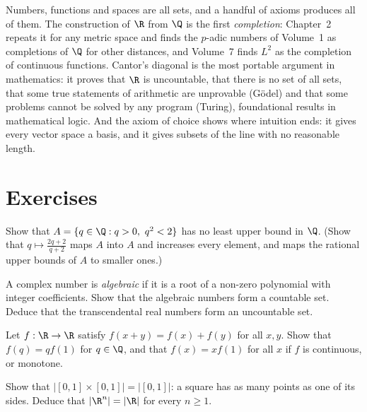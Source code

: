 \begin{beauty}
Numbers, functions and spaces are all sets, and a handful of axioms produces all of them. The construction of $\R$
from $\Q$ is the first \emph{completion}: Chapter~2 repeats it for any metric space and finds the $p$-adic numbers of
Volume~1 as completions of $\Q$ for other distances, and Volume~7 finds $L^2$ as the completion of continuous
functions. Cantor's diagonal is the most portable argument in mathematics: it proves that $\R$ is uncountable, that
there is no set of all sets, that some true statements of arithmetic are unprovable (G\"odel) and that some
problems cannot be solved by any program (Turing), foundational results in mathematical logic. And the axiom of choice shows where
intuition ends: it gives every vector space a basis, and it gives subsets of the line with no reasonable length.
\end{beauty}

\section{Exercises}

\begin{exercise}[$\star$]\label{ex:sqrt2}
Show that $A=\{q\in\Q:q>0,\ q^2<2\}$ has no least upper bound in $\Q$. (Show that $q\mapsto\frac{2q+2}{q+2}$ maps $A$ into $A$ and increases every element,
and maps the rational upper bounds of $A$ to smaller ones.)
\end{exercise}

\begin{exercise}[$\star$]\label{ex:algebraic}
A complex number is \emph{algebraic} if it is a root of a non-zero polynomial with integer coefficients. Show that the
algebraic numbers form a countable set. Deduce that the transcendental real numbers form an uncountable set.
\end{exercise}

\begin{exercise}[$\star$]\label{ex:cauchyfe}
Let $f:\R\to\R$ satisfy $f(x+y)=f(x)+f(y)$ for all $x,y$. Show that $f(q)=qf(1)$ for $q\in\Q$, and that $f(x)=xf(1)$ for all $x$ if $f$ is continuous,
or monotone.
\end{exercise}

\begin{exercise}[$\star\star$]\label{ex:square}
Show that $|[0,1]\times[0,1]|=|[0,1]|$: a square has as many points as one of its sides. Deduce that $|\R^n|=|\R|$ for every $n\ge1$.
\end{exercise}

